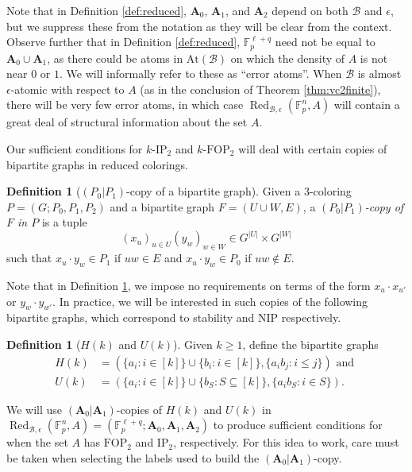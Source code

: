 \documentclass[12pt,oneside,british,a4wide]{amsart}
\numberwithin{equation}{section}
\theoremstyle{definition}
\newtheorem{definition}[theorem]{Definition}
\def\F{\mathbb{F}}
\def\FOP{\mathrm{FOP}}
\def\IP{\mathrm{IP}}
\def\e{\epsilon}
\newcommand{\calB}{\mathcal{B}}
\newcommand{\Red}{{\mathrm{Red}}}
\newcommand{\At}{{\mathrm{At}}}
\def\Red{\operatorname{Red}}
\begin{document}
Note that in Definition \ref{def:reduced}, $\mathbf{A}_0$, $\mathbf{A}_1$, and $\mathbf{A}_2$ depend on both $\calB$ and $\e$, but we suppress these from the notation as they will be clear from the context.  Observe further that in Definition \ref{def:reduced}, $\F_p^{\ell+q}$ need not be equal to $\mathbf{A}_0\cup \mathbf{A}_1$, as there could be atoms in $\At(\calB)$ on which the density of $A$ is not near $0$ or $1$.  We will informally refer to these as ``error atoms''. When $\calB$ is almost $\e$-atomic with respect to $A$ (as in the conclusion of Theorem \ref{thm:vc2finite}), there will be very few error atoms, in which case  $\Red_{\calB,\e}(\F_p^n,A)$ will contain a great deal of structural information about the set $A$.  

Our sufficient conditions for $k$-$\IP_2$ and $k$-$\FOP_2$ will deal with certain copies of bipartite graphs in reduced colorings.  

\begin{definition}[$(P_0|P_1)$-copy of a bipartite graph]\label{def:copy}
Given a $3$-coloring $P=(G; P_0,P_1,P_2)$ and a bipartite graph $F=(U\cup W, E)$, a \emph{$(P_0|P_1)$-copy of $F$ in $P$} is a tuple 
$$
(x_u)_{u\in U}(y_w)_{w\in W}\in G^{|U|}\times G^{|W|}
$$
 such that $x_u\cdot y_w\in P_1$ if $uw\in E$ and $x_u\cdot y_w\in P_0$ if $uw\notin E$. 
\end{definition}
Note that in Definition \ref{def:copy}, we impose no requirements on terms of the form $x_u\cdot x_{u'}$ or $y_w\cdot y_{w'}$.  In practice, we will be interested in such copies of the following bipartite graphs, which correspond to stability and NIP respectively.

\begin{definition}[$H(k)$ and $U(k)$]\label{def:ukhk}
Given $k\geq 1$, define the bipartite graphs
\begin{align*}
H(k)&=(\{a_i:i\in [k]\}\cup \{b_i: i\in [k]\}, \{a_ib_j: i\leq j\})\text{ and }\\
U(k)&= (\{a_i:i\in [k]\}\cup \{b_S:  S\subseteq [k]\},\{a_ib_S: i\in S\}).
\end{align*}
\end{definition}

We will use $(\mathbf{A}_0|\mathbf{A}_1)$-copies of $H(k)$ and $U(k)$ in $\Red_{\calB,\e}(\F_p^n,A)=(\F_p^{\ell+q};\mathbf{A}_0,\mathbf{A}_1,\mathbf{A}_2)$ to produce sufficient conditions for when the set $A$ has $\FOP_2$ and $\IP_2$, respectively. For this idea to work,  care must be taken when selecting the labels used to build the $(\mathbf{A}_0|\mathbf{A}_1)$-copy.  
\end{document}
